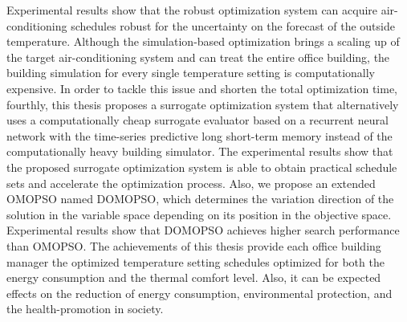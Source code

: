 \documentclass[a4paper, 12pt,dvipdfmx]{jsbook}
\begin{document}
Experimental results show that the robust optimization system can acquire air-conditioning schedules robust for the uncertainty on the forecast of the outside temperature. Although the simulation-based optimization brings a scaling up of the target air-conditioning system and can treat the entire office building, the building simulation for every single temperature setting is computationally expensive. In order to tackle this issue and shorten the total optimization time, fourthly, this thesis proposes a surrogate optimization system that alternatively uses a computationally cheap surrogate evaluator based on a recurrent neural network with the time-series predictive long short-term memory instead of the computationally heavy building simulator. The experimental results show that the proposed surrogate optimization system is able to obtain practical schedule sets and accelerate the optimization process. Also, we propose an extended OMOPSO named DOMOPSO, which determines the variation direction of the solution in the variable space depending on its position in the objective space. Experimental results show that DOMOPSO achieves higher search performance than OMOPSO. The achievements of this thesis provide each office building manager the optimized temperature setting schedules optimized for both the energy consumption and the thermal comfort level. Also, it can be expected effects on the reduction of energy consumption, environmental protection, and the health-promotion in society.
\end{document}
